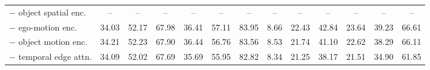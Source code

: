 \begin{table}[t]
{\begin{tabular}{l cccccc cccccc}
$-$ object spatial enc. & -- & -- & -- & -- & -- & -- & -- & -- & -- & -- & -- & -- \\
$-$ ego-motion enc. & 34.03 & 52.17 & 67.98 & 36.41 & 57.11 & 83.95 & 8.66 & 22.43 & 42.84 & 23.64 & 39.23 & 66.61 \\
$-$ object motion enc. & 34.21 & 52.23 & 67.90 & 36.44 & 56.76 & 83.56 & 8.53 & 21.74 & 41.10 & 22.62 & 38.29 & 66.11 \\
$-$ temporal edge attn. & 34.09 & 52.02 & 67.69 & 35.69 & 55.95 & 82.82 & 8.34 & 21.25 & 38.17 & 21.51 & 34.90 & 61.85 \\
\bottomrule
\end{tabular}}
\end{table}
